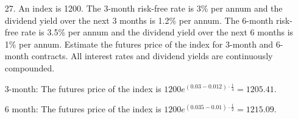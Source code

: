 \documentclass{article}
\begin{document}
\begin{itemize}
\begin{proof}
			Thus, it must hold that $F_0=S_0e^{(r-q)T}.$
		\end{proof}

	\item[27.] An index is 1200. The 3-month risk-free rate is 3\% per annum and the dividend yield over the next 3 months is 1.2\% per annum. The 6-month risk-free rate is 3.5\% per annum and the dividend yield over the next 6 months is 1\% per annum. Estimate the futures price of the index for 3-month and 6-month contracts. All interest rates and dividend yields are continuously compounded.
		\begin{soln}
			3-month: The futures price of the index is $1200e^{(0.03-0.012)\cdot \frac{1}{4}} = 1205.41.$

			6 month: The futures price of the index is $1200e^{(0.035-0.01)\cdot \frac{1}{2}} = 1215.09.$
		\end{soln}
		
\end{itemize}
\end{document}
